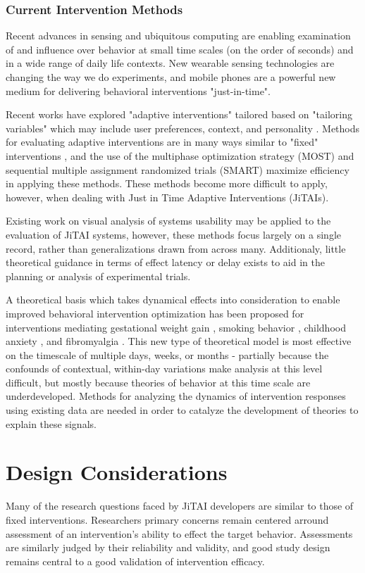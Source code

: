\documentclass[review,journal]{vgtc}         %
\begin{document}
\subsubsection{Current Intervention Methods}
Recent advances in sensing and ubiquitous computing are enabling examination of and influence over behavior at small time scales (on the order of seconds) and in a wide range of daily life contexts.
New wearable sensing technologies are changing the way we do experiments, and mobile phones are a powerful new medium for delivering behavioral interventions "just-in-time".

Recent works have explored "adaptive interventions" tailored based on "tailoring variables" which may include user preferences, context, and personality \cite{collins2004}. 
Methods for evaluating adaptive interventions are in many ways similar to "fixed" interventions \cite{collins2004}, and the use of the multiphase optimization strategy (MOST) and sequential multiple assignment randomized trials (SMART) \cite{collins2007} maximize efficiency in applying these methods.
These methods become more difficult to apply, however, when dealing with Just in Time Adaptive Interventions (JiTAIs).

Existing work on visual analysis of systems usability \cite{harrison1994} may be applied to the evaluation of JiTAI systems, however, these methods focus largely on a single record, rather than generalizations drawn from across many.
Additionaly, little theoretical guidance in terms of effect latency or delay exists to aid in the planning or analysis of experimental trials.

A theoretical basis which takes dynamical effects into consideration to enable improved behavioral intervention optimization has been proposed for interventions mediating gestational weight gain \cite{dong2013}, smoking behavior \cite{timms2014}, childhood anxiety \cite{pina2014}, and fibromyalgia \cite{deshpande2014}.
This new type of theoretical model is most effective on the timescale of multiple days, weeks, or months - partially because the confounds of contextual, within-day variations make analysis at this level difficult, but mostly because theories of behavior at this time scale are underdeveloped.
Methods for analyzing the dynamics of intervention responses using existing data are needed in order to catalyze the development of theories to explain these signals. 

\section{Design Considerations}
Many of the research questions faced by JiTAI developers are similar to those of fixed interventions. 
Researchers primary concerns remain centered arround assessment of an intervention's ability to effect the target behavior.
Assessments are similarly judged by their reliability and validity, and good study design remains central to a good validation of intervention efficacy.
\end{document}
